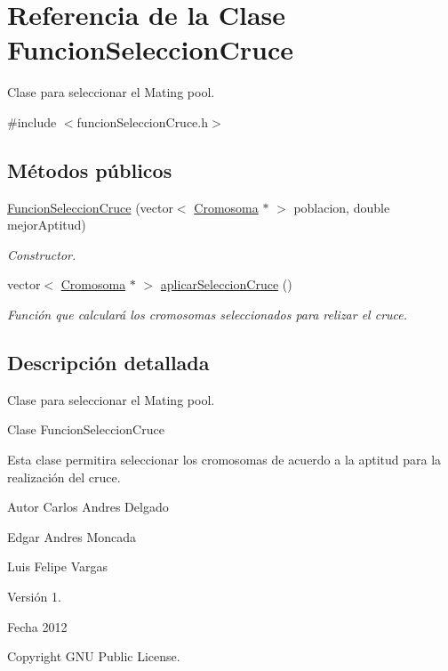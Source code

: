 \hypertarget{classFuncionSeleccionCruce}{\section{Referencia de la Clase Funcion\-Seleccion\-Cruce}
\label{classFuncionSeleccionCruce}
}


Clase para seleccionar el Mating pool.  




{\ttfamily \#include $<$funcion\-Seleccion\-Cruce.\-h$>$}

\subsection*{Métodos públicos}
\begin{DoxyCompactItemize}
\item 
\hyperlink{classFuncionSeleccionCruce_ad8022bce0a07d6a8a59f84b01910939e}{Funcion\-Seleccion\-Cruce} (vector$<$ \hyperlink{classCromosoma}{Cromosoma} $\ast$ $>$ poblacion, double mejor\-Aptitud)
\begin{DoxyCompactList}\small\item\em Constructor. \end{DoxyCompactList}\item 
vector$<$ \hyperlink{classCromosoma}{Cromosoma} $\ast$ $>$ \hyperlink{classFuncionSeleccionCruce_a31e6a637a8b4f92e5fc0b953c2d12f07}{aplicar\-Seleccion\-Cruce} ()
\begin{DoxyCompactList}\small\item\em Función que calculará los cromosomas seleccionados para relizar el cruce. \end{DoxyCompactList}\end{DoxyCompactItemize}


\subsection{Descripción detallada}
Clase para seleccionar el Mating pool. 

\begin{DoxyVerb}Clase FuncionSeleccionCruce
\end{DoxyVerb}


Esta clase permitira seleccionar los cromosomas de acuerdo a la aptitud para la realización del cruce. \begin{DoxyAuthor}{Autor}
Carlos Andres Delgado 

Edgar Andres Moncada 

Luis Felipe Vargas 
\end{DoxyAuthor}
\begin{DoxyVersion}{Versión}
1. 
\end{DoxyVersion}
\begin{DoxyDate}{Fecha}
2012 
\end{DoxyDate}
\begin{DoxyCopyright}{Copyright}
G\-N\-U Public License. 
\end{DoxyCopyright}


